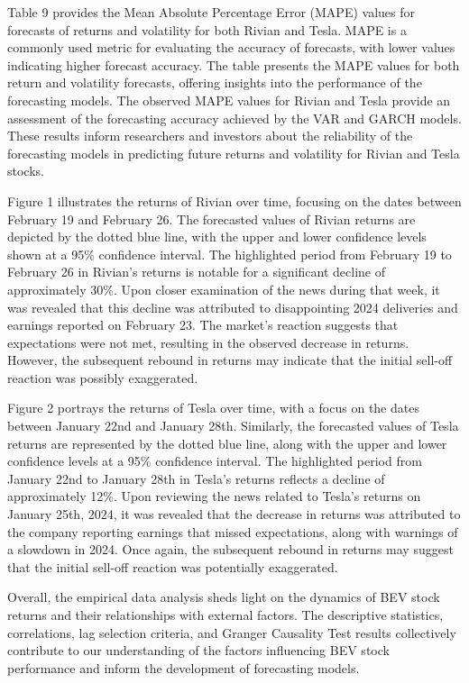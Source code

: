 \documentclass[a4paper,12pt]{article}
\begin{document}
Table 9 provides the Mean Absolute Percentage Error (MAPE) values for forecasts of returns and volatility for both Rivian and Tesla. MAPE is a commonly used metric for evaluating the accuracy of forecasts, with lower values indicating higher forecast accuracy. The table presents the MAPE values for both return and volatility forecasts, offering insights into the performance of the forecasting models. The observed MAPE values for Rivian and Tesla provide an assessment of the forecasting accuracy achieved by the VAR and GARCH models. These results inform researchers and investors about the reliability of the forecasting models in predicting future returns and volatility for Rivian and Tesla stocks.

Figure 1 illustrates the returns of Rivian over time, focusing on the dates between February 19 and February 26. The forecasted values of Rivian returns are depicted by the dotted blue line, with the upper and lower confidence levels shown at a 95\% confidence interval. The highlighted period from February 19 to February 26 in Rivian's returns is notable for a significant decline of approximately 30\%. Upon closer examination of the news during that week, it was revealed that this decline was attributed to disappointing 2024 deliveries and earnings reported on February 23. The market's reaction suggests that expectations were not met, resulting in the observed decrease in returns. However, the subsequent rebound in returns may indicate that the initial sell-off reaction was possibly exaggerated.

Figure 2 portrays the returns of Tesla over time, with a focus on the dates between January 22nd and January 28th. Similarly, the forecasted values of Tesla returns are represented by the dotted blue line, along with the upper and lower confidence levels at a 95\% confidence interval. The highlighted period from January 22nd to January 28th in Tesla's returns reflects a decline of approximately 12\%. Upon reviewing the news related to Tesla's returns on January 25th, 2024, it was revealed that the decrease in returns was attributed to the company reporting earnings that missed expectations, along with warnings of a slowdown in 2024. Once again, the subsequent rebound in returns may suggest that the initial sell-off reaction was potentially exaggerated.


Overall, the empirical data analysis sheds light on the dynamics of BEV stock returns and their relationships with external factors. The descriptive statistics, correlations, lag selection criteria, and Granger Causality Test results collectively contribute to our understanding of the factors influencing BEV stock performance and inform the development of forecasting models.
\end{document}
